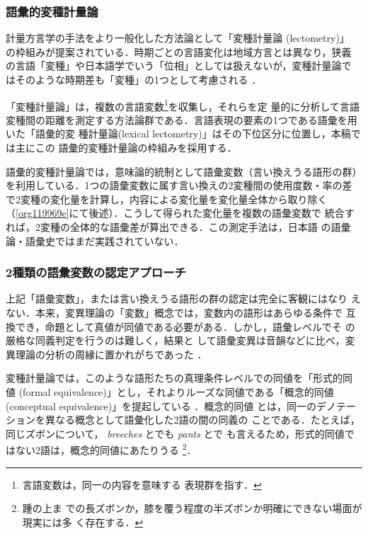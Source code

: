 \documentclass[submit]{ipsj}
\renewcommand{\ref}{\cref}
\begin{document}
\subsubsection{語彙的変種計量論\label{org440eea6}}
\label{sec:org04f4c76}
計量方言学の手法をより一般化した方法論として「変種計量論 (lectometry)」
の枠組みが提案されている．時期ごとの言語変化は地域方言とは異なり，狭義
の言語「変種」や日本語学でいう「位相」としては扱えないが，変種計量論で
はそのような時期差も「変種」の1つとして考慮される
\cite{Geeraerts2023Lexical}．

「変種計量論」は，複数の言語変数\footnote{言語変数は，同一の内容を意味する
表現群を指す\cite{Labov1972Sociolinguistic}．}を収集し，それらを定
量的に分析して言語変種間の距離を測定する方法論群である\cite{Ruette2014Semantic}．言語表現の要素の1つである語彙を用いた「語彙的変
種計量論(lexical lectometry)」はその下位区分に位置し，本稿では主にこの
語彙的変種計量論の枠組みを採用する．

語彙的変種計量論では，意味論的統制として語彙変数（言い換えうる語形の群）
を利用している．1つの語彙変数に属す言い換えの2変種間の使用度数・率の差
で2変種の変化量を計算し，内容による変化量を変化量全体から取り除く
（\ref{org119969e}にて後述）．こうして得られた変化量を複数の語彙変数で
統合すれば，2変種の全体的な語彙差が算出できる．この測定手法は，日本語
の語彙論・語彙史ではまだ実践されていない．
\subsubsection{2種類の語彙変数の認定アプローチ}
\label{sec:orgb618bc7}
上記「語彙変数」，または言い換えうる語形の群の認定は完全に客観にはなり
えない．本来，変異理論の「変数」概念では，変数内の語形はあらゆる条件で
互換でき，命題として真値が同値である必要がある．しかし，語彙レベルでそ
の厳格な同義判定を行うのは難しく\cite{Lavandera1978Where}，結果と
して語彙変異は音韻などに比べ，変異理論の分析の周縁に置かれがちであった
\cite{DePascale2019Tokenbased}．

変種計量論では，このような語形たちの真理条件レベルでの同値を「形式的同
値 (formal equivalence)」とし，それよりルーズな同値である「概念的同値
(conceptual equivalence)」を提起している
\cite{Geeraerts2023Lexical,DePascale2019Tokenbased}．概念的同値
とは，同一のデノテーションを異なる概念として語彙化した2語の間の同義の
ことである．たとえば，同じズボンについて， \emph{breeches} とでも \emph{pants} とで
も言えるため，形式的同値ではない2語は，概念的同値にあたりうる
\cite{DePascale2019Tokenbased,Geeraerts2023Lexical}\footnote{踵の上ま
での長ズボンか，膝を覆う程度の半ズボンか明確にできない場面が現実には多
く存在する．}．
\end{document}
